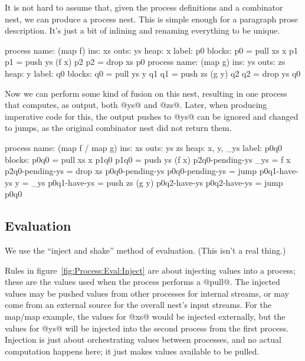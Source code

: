 It is not hard to assume that, given the process definitions and a combinator nest, we can produce a process nest.
This is simple enough for a paragraph prose description.
It's just a bit of inlining and renaming everything to be unique.

\begin{code}
process
    name: (map f)
     ins: xs
    outs: ys
    heap: {x}
   label: p0
  blocks: p0 = pull xs    x  p1
          p1 = push ys (f x) p2
          p2 = drop xs       p0
process
    name: (map g)
     ins: ys
    outs: zs
    heap: {y}
   label: q0
  blocks: q0 = pull ys    y  q1
          q1 = push zs (g y) q2
          q2 = drop ys       q0
\end{code}

Now we can perform some kind of fusion on this nest, resulting in one process that computes, as output, both @ys@ and @zs@.
Later, when producing imperative code for this, the output pushes to @ys@ can be ignored and changed to jumps, as the original combinator nest did not return them.

\begin{code}
process
    name: (map f / map g)
     ins: xs
    outs: ys zs
    heap: {x, y, _ys}
   label: p0q0
  blocks: p0q0            = pull xs    x  p1q0
          p1q0            = push ys (f x) p2q0-pending-ys { _ys = f x }
          p2q0-pending-ys = drop xs       p0q0-pending-ys
          p0q0-pending-ys = jump          p0q1-have-ys    { y = _ys }
          p0q1-have-ys    = push zs (g y) p0q2-have-ys
          p0q2-have-ys    = jump          p0q0
\end{code}

\subsection{Evaluation}
\label{s:Process:Eval}




We use the ``inject and shake'' method of evaluation. (This isn't a real thing.)

Rules in figure~\ref{fig:Process:Eval:Inject} are about injecting values into a process; these are the values used when the process performs a @pull@.
The injected values may be pushed values from other processes for internal streams, or may come from an external source for the overall nest's input streams.
For the map/map example, the values for @xs@ would be injected externally, but the values for @ys@ will be injected into the second process from the first process.
Injection is just about orchestrating values between processes, and no actual computation happens here; it just makes values available to be pulled.

